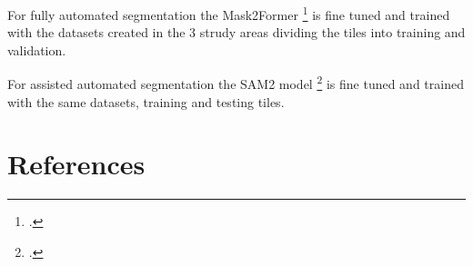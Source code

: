 \begin{refsection}
For fully automated segmentation the Mask2Former \footcite{cheng_masked-attention_2022} is fine tuned and trained with the datasets created in the 3 strudy areas dividing the tiles into training and validation.


For assisted automated segmentation the SAM2 model \footcite{ravi_sam_2024} is fine tuned and trained with the same datasets, training and testing tiles.

\newpage

\renewcommand{\sectionnametext}{References}
\renewcommand{\headingtextR}{\thesection. \sectionnametext}
\section{\sectionnametext}

\printbibliography[heading=none]


\end{refsection}
